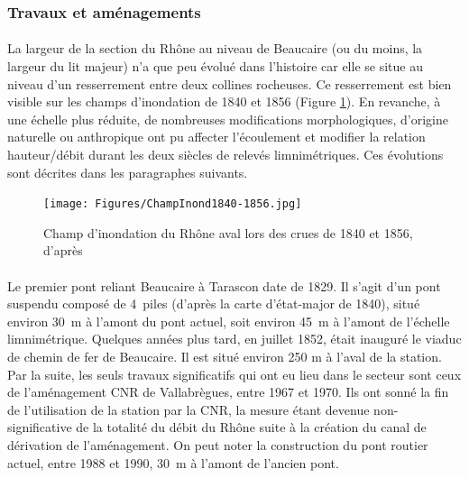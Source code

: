 \documentclass[11pt]{article}
\begin{document}
\FloatBarrier

		\subsubsection{Travaux et aménagements}
    	\label{subsubsec:TravauxPt}
    
    \paragraph{} La largeur de la section du Rhône au niveau de Beaucaire (ou du moins, la largeur du lit majeur) n'a que peu évolué dans l'histoire car elle se situe au niveau d'un resserrement entre deux collines rocheuses. Ce resserrement est bien visible sur les champs d'inondation de 1840 et 1856 (Figure \ref{Champ1856}). En revanche, à une échelle plus réduite, de nombreuses modifications morphologiques, d'origine naturelle ou anthropique ont pu affecter l'écoulement et modifier la relation hauteur/débit durant les deux siècles de relevés limnimétriques. Ces évolutions sont décrites dans les paragraphes suivants.
        
    \begin{figure}[h]
        \centering
        \texttt{[image: Figures/ChampInond1840-1856.jpg]}
        \caption{Champ d'inondation du Rhône aval lors des crues de 1840 et 1856, d'après \citet{parde_regime_1925}}
        \label{Champ1856}
    \end{figure}
    

	\paragraph{} Le premier pont reliant Beaucaire à Tarascon date de 1829. Il s'agit d'un pont suspendu composé de 4~piles (d'après la carte d'état-major de 1840), situé environ 30~m à l'amont du pont actuel, soit environ 45~m à l'amont de l'échelle limnimétrique. Quelques années plus tard, en juillet 1852, était inauguré le viaduc de chemin de fer de Beaucaire. Il est situé environ 250 m à l'aval de la station. Par la suite, les seuls travaux significatifs qui ont eu lieu dans le secteur sont ceux de l'aménagement CNR de Vallabrègues, entre 1967 et 1970. Ils ont sonné la fin de l'utilisation de la station par la CNR, la mesure étant devenue non-significative de la totalité du débit du Rhône suite à la création du canal de dérivation de l'aménagement. On peut noter la construction du pont routier actuel, entre 1988 et 1990, 30~m à l'amont de l'ancien pont. 
        
\end{document}
